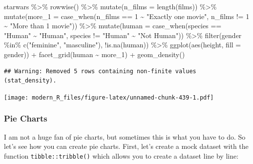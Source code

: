 \documentclass[
]{article}
\newenvironment{Shaded}{\begin{snugshade}}{\end{snugshade}}
\newcommand{\AttributeTok}[1]{\textcolor[rgb]{0.77,0.63,0.00}{#1}}
\newcommand{\DecValTok}[1]{\textcolor[rgb]{0.00,0.00,0.81}{#1}}
\newcommand{\FunctionTok}[1]{\textcolor[rgb]{0.00,0.00,0.00}{#1}}
\newcommand{\NormalTok}[1]{#1}
\newcommand{\SpecialCharTok}[1]{\textcolor[rgb]{0.00,0.00,0.00}{#1}}
\newcommand{\StringTok}[1]{\textcolor[rgb]{0.31,0.60,0.02}{#1}}
\begin{document}
\begin{Shaded}
\begin{Highlighting}[]
\NormalTok{starwars }\SpecialCharTok{\%\textgreater{}\%}
  \FunctionTok{rowwise}\NormalTok{() }\SpecialCharTok{\%\textgreater{}\%}
  \FunctionTok{mutate}\NormalTok{(}\AttributeTok{n\_films =} \FunctionTok{length}\NormalTok{(films)) }\SpecialCharTok{\%\textgreater{}\%}
  \FunctionTok{mutate}\NormalTok{(}\AttributeTok{more\_1 =} \FunctionTok{case\_when}\NormalTok{(n\_films }\SpecialCharTok{==} \DecValTok{1} \SpecialCharTok{\textasciitilde{}} \StringTok{"Exactly one movie"}\NormalTok{,}
\NormalTok{                            n\_films }\SpecialCharTok{!=} \DecValTok{1} \SpecialCharTok{\textasciitilde{}} \StringTok{"More than 1 movie"}\NormalTok{)) }\SpecialCharTok{\%\textgreater{}\%}
  \FunctionTok{mutate}\NormalTok{(}\AttributeTok{human =} \FunctionTok{case\_when}\NormalTok{(species }\SpecialCharTok{==} \StringTok{"Human"} \SpecialCharTok{\textasciitilde{}} \StringTok{"Human"}\NormalTok{,}
\NormalTok{                           species }\SpecialCharTok{!=} \StringTok{"Human"} \SpecialCharTok{\textasciitilde{}} \StringTok{"Not Human"}\NormalTok{)) }\SpecialCharTok{\%\textgreater{}\%}
  \FunctionTok{filter}\NormalTok{(gender }\SpecialCharTok{\%in\%} \FunctionTok{c}\NormalTok{(}\StringTok{"feminine"}\NormalTok{, }\StringTok{"masculine"}\NormalTok{), }\SpecialCharTok{!}\FunctionTok{is.na}\NormalTok{(human)) }\SpecialCharTok{\%\textgreater{}\%}
  \FunctionTok{ggplot}\NormalTok{(}\FunctionTok{aes}\NormalTok{(height, }\AttributeTok{fill =}\NormalTok{ gender)) }\SpecialCharTok{+}
  \FunctionTok{facet\_grid}\NormalTok{(human }\SpecialCharTok{\textasciitilde{}}\NormalTok{ more\_1) }\SpecialCharTok{+}
  \FunctionTok{geom\_density}\NormalTok{()}
\end{Highlighting}
\end{Shaded}

\begin{verbatim}
## Warning: Removed 5 rows containing non-finite values (stat_density).
\end{verbatim}

\texttt{[image: modern\_R\_files/figure-latex/unnamed-chunk-439-1.pdf]}

\hypertarget{pie-charts}{%
\subsubsection{Pie Charts}\label{pie-charts}}

I am not a huge fan of pie charts, but sometimes this is what you have to do. So let's see how you
can create pie charts.
First, let's create a mock dataset with the function \texttt{tibble::tribble()} which allows you to create a
dataset line by line:
\end{document}
